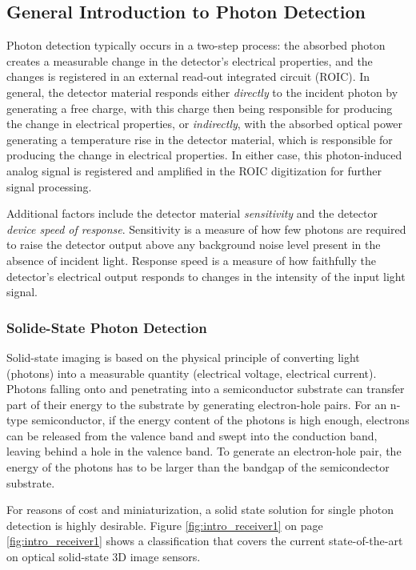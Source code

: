 \subsection{General Introduction to Photon Detection}
\label{introReceiver}
Photon detection typically occurs in a two-step process: the absorbed photon creates a measurable change in the detector's electrical properties, and the changes is registered in an external read-out integrated circuit (\acs{ROIC}). In general, the detector material responds either \textit{directly} to the incident photon by generating a free charge, with this charge then being responsible for producing the change in electrical properties, or \textit{indirectly}, with the absorbed optical power generating a temperature rise in the detector material, which is responsible for producing the change in electrical properties. In either case, this photon-induced analog signal is registered and amplified in the \acs{ROIC} digitization for further signal processing. 

Additional factors include the detector material \textit{sensitivity} and the detector \textit{device speed of response}. Sensitivity is a measure of how few photons are required to raise the detector output above any background noise level present in the absence of incident light. Response speed is a measure of how faithfully the detector's electrical output responds to changes in the intensity of the input light signal.

\subsubsection{Solide-State Photon Detection}
\label{ssphotonsensing}
Solid-state imaging is based on the physical principle of converting light (photons) into a measurable quantity (electrical voltage, electrical current). Photons falling onto and penetrating into a semiconductor substrate can transfer part of their energy to the substrate by generating electron-hole pairs. For an n-type semiconductor, if the energy content of the photons is high enough, electrons can be released from the valence band and swept into the conduction band, leaving behind a hole in the valence band. To generate an electron-hole pair, the energy of the photons has to be larger than the bandgap of the semicondector substrate.

For reasons of cost and miniaturization, a solid state solution for single photon detection is highly desirable. Figure \ref{fig:intro_receiver1} on page \ref{fig:intro_receiver1} shows a classification that covers the current state-of-the-art on optical solid-state 3D image sensors. 

